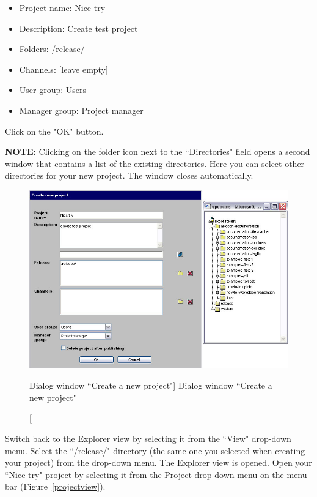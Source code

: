\begin{itemize}
\item Project name: Nice try
\item Description: Create test project
\item Folders: /release/
\item Channels: [leave empty]
\item User group: Users
\item Manager group: Project manager
\end{itemize}

Click on the "OK" button.

\textbf{NOTE:} Clicking on the folder icon next to the
``Directories" field opens a second window that contains a list of
the existing directories. Here you can select other directories for your
new project. The window closes automatically.

\begin{figure}[!hbt]
\begin{center}
\includegraphics[width=\sgw]
                   {pics/usermanual/newProject}
\caption[Dialog window ``Create a new project"]
           {Dialog window ``Create a new project"}
\label{createnewproject}
\end{center}
\end{figure}

Switch back to the Explorer view by selecting it from the ``View"
drop-down menu. Select the ``/release/" directory (the same one you
selected when creating your project) from the drop-down menu. The
Explorer view is opened. Open your ``Nice try" project by selecting
it from the Project drop-down menu on the menu bar
(Figure~\ref{projectview}).


